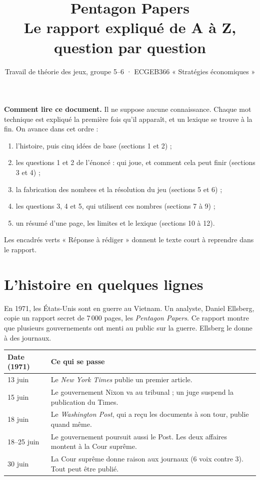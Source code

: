 \documentclass[11pt,a4paper]{article}
\title{\textbf{Pentagon Papers}\\[3pt]\large Le rapport expliqué de A à Z, question par question}
\author{Travail de théorie des jeux, groupe 5--6 · ECGEB366 « Stratégies économiques »}
\date{}
\theoremstyle{definition}
\begin{document}
\maketitle
\vspace{-1.2cm}

\begin{resultat}
\textbf{Comment lire ce document.} Il ne suppose aucune connaissance. Chaque mot technique est expliqué la première fois qu'il apparaît, et un lexique se trouve à la fin. On avance dans cet ordre :
\begin{enumerate}[leftmargin=*,itemsep=0pt,topsep=2pt]
\item l'histoire, puis cinq idées de base (sections 1 et 2) ;
\item les questions 1 et 2 de l'énoncé : qui joue, et comment cela peut finir (sections 3 et 4) ;
\item la fabrication des nombres et la résolution du jeu (sections 5 et 6) ;
\item les questions 3, 4 et 5, qui utilisent ces nombres (sections 7 à 9) ;
\item un résumé d'une page, les limites et le lexique (sections 10 à 12).
\end{enumerate}
Les encadrés verts « Réponse à rédiger » donnent le texte court à reprendre dans le rapport.
\end{resultat}

\section{L'histoire en quelques lignes}

En 1971, les États-Unis sont en guerre au Vietnam. Un analyste, Daniel Ellsberg, copie un rapport secret de 7\,000 pages, les \emph{Pentagon Papers}. Ce rapport montre que plusieurs gouvernements ont menti au public sur la guerre. Ellsberg le donne à des journaux.

\begin{center}
\small
\begin{tabular}{@{}ll@{}}
\toprule
Date (1971) & Ce qui se passe \\
\midrule
13 juin & Le \emph{New York Times} publie un premier article. \\
15 juin & Le gouvernement Nixon va au tribunal ; un juge suspend la publication du Times. \\
18 juin & Le \emph{Washington Post}, qui a reçu les documents à son tour, publie quand même. \\
18--25 juin & Le gouvernement poursuit aussi le Post. Les deux affaires montent à la Cour suprême. \\
30 juin & La Cour suprême donne raison aux journaux (6 voix contre 3). Tout peut être publié. \\
\bottomrule
\end{tabular}
\end{center}
\end{document}
